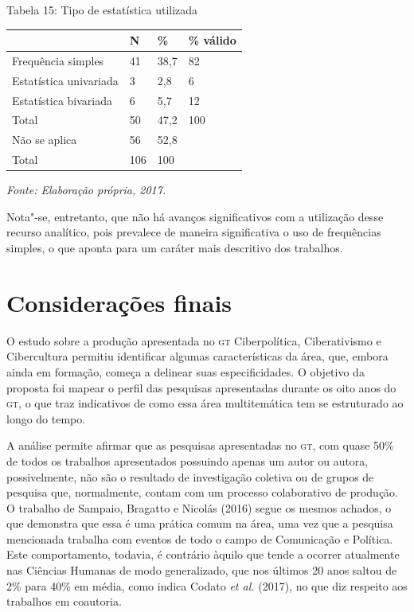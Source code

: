 \begin{center}
Tabela 15: Tipo de estatística utilizada
\end{center}

\begin{center}
\centering
\begin{tabular}{|l|l|l|l|}
\hline
 & \textbf{N} & \textbf{\%} & \textbf{\% válido} \\ \hline
Frequência simples & 41 & 38,7 & 82 \\ \hline
Estatística univariada & 3 & 2,8 & 6 \\ \hline
Estatística bivariada & 6 & 5,7 & 12 \\ \hline
Total & 50 & 47,2 & 100 \\ \hline
Não se aplica & 56 & 52,8 &  \\ \hline
Total & 106 & 100 &  \\ \hline
\end{tabular}
\end{center}

\begin{center}
{\footnotesize\emph{Fonte: Elaboração própria, 2017.}}
\end{center}

Nota"-se, entretanto, que não há avanços significativos com a utilização
desse recurso analítico, pois prevalece de maneira significativa o uso
de frequências simples, o que aponta para um caráter mais descritivo dos
trabalhos.

\section{Considerações finais}

\noindent{}O estudo sobre a produção apresentada no \textsc{gt} Ciberpolítica, Ciberativismo
e Cibercultura permitiu identificar algumas características da área,
que, embora ainda em formação, começa a delinear suas especificidades. O
objetivo da proposta foi mapear o perfil das pesquisas apresentadas
durante os oito anos do \textsc{gt}, o que traz indicativos de como essa área
multitemática tem se estruturado ao longo do tempo.

A análise permite afirmar que as pesquisas apresentadas no \textsc{gt}, com quase
50\% de todos os trabalhos apresentados possuindo apenas um autor ou
autora, possivelmente, não são o resultado de investigação coletiva ou
de grupos de pesquisa que, normalmente, contam com um processo
colaborativo de produção. O trabalho de Sampaio, Bragatto e Nicolás
(2016) segue os mesmos achados, o que demonstra que essa é uma prática
comum na área, uma vez que a pesquisa mencionada trabalha com eventos de
todo o campo de Comunicação e Política. Este comportamento, todavia, é
contrário àquilo que tende a ocorrer atualmente nas Ciências Humanas de
modo generalizado, que nos últimos 20 anos saltou de 2\% para 40\% em
média, como indica Codato \emph{et al.} (2017), no que diz respeito aos
trabalhos em coautoria.

